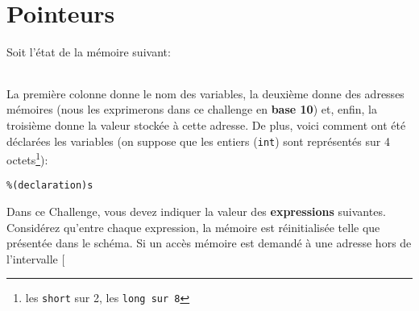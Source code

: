 \setcounter{section}{0}
\section{Pointeurs}

Soit l'état de la mémoire suivant:

\begin{table}[!htbp]
  \centering
  \begin{tabular}{ll|l|}
  \end{tabular}
\end{table}

La première colonne donne le nom des variables, la deuxième donne des adresses
mémoires (nous les exprimerons dans ce challenge en \textbf{base 10}) et, enfin,
la troisième donne la valeur stockée à cette adresse. De plus, voici comment ont été déclarées les variables (on suppose que les entiers (\texttt{int}) sont représentés sur 4
octets\footnote{les \texttt{short} sur 2, les \texttt{long sur 8}}):

\begin{lstlisting}
%(declaration)s
\end{lstlisting}

Dans ce Challenge, vous devez indiquer la valeur des \textbf{expressions}
suivantes. Considérez qu'entre chaque expression, la mémoire est réinitialisée
telle que présentée dans le schéma. Si un accès mémoire est demandé à une
adresse hors de l'intervalle [%

\newpage

\begin{enumerate}

\end{enumerate}
\newpage


